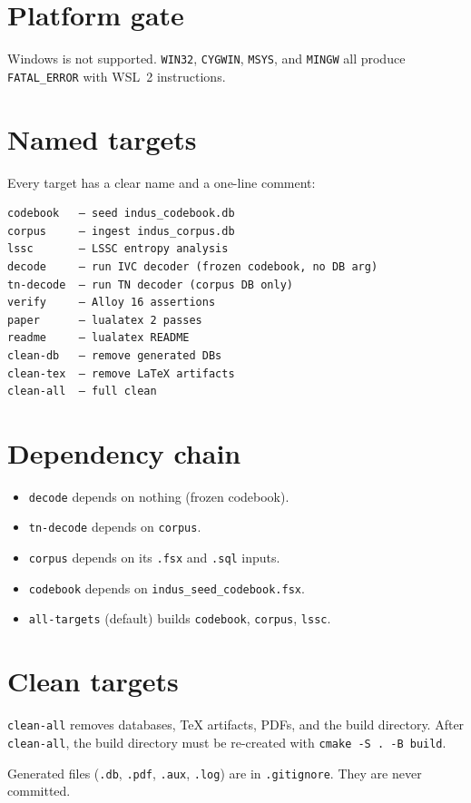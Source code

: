 \documentclass[11pt]{article}
\begin{document}
\section{Platform gate}

Windows is not supported. \texttt{WIN32}, \texttt{CYGWIN},
\texttt{MSYS}, and \texttt{MINGW} all produce
\texttt{FATAL\_ERROR} with WSL~2 instructions.

\section{Named targets}

Every target has a clear name and a one-line comment:

\begin{Verbatim}[fontsize=\small,frame=single]
codebook   — seed indus_codebook.db
corpus     — ingest indus_corpus.db
lssc       — LSSC entropy analysis
decode     — run IVC decoder (frozen codebook, no DB arg)
tn-decode  — run TN decoder (corpus DB only)
verify     — Alloy 16 assertions
paper      — lualatex 2 passes
readme     — lualatex README
clean-db   — remove generated DBs
clean-tex  — remove LaTeX artifacts
clean-all  — full clean
\end{Verbatim}

\section{Dependency chain}

\begin{itemize}[nosep]
\item \texttt{decode} depends on nothing (frozen codebook).
\item \texttt{tn-decode} depends on \texttt{corpus}.
\item \texttt{corpus} depends on its \texttt{.fsx} and
  \texttt{.sql} inputs.
\item \texttt{codebook} depends on
  \texttt{indus\_seed\_codebook.fsx}.
\item \texttt{all-targets} (default) builds
  \texttt{codebook}, \texttt{corpus}, \texttt{lssc}.
\end{itemize}

\section{Clean targets}

\texttt{clean-all} removes databases, TeX artifacts, PDFs,
and the build directory. After \texttt{clean-all}, the
build directory must be re-created with \texttt{cmake -S . -B build}.

Generated files (\texttt{.db}, \texttt{.pdf}, \texttt{.aux},
\texttt{.log}) are in \texttt{.gitignore}. They are never
committed.
\end{document}
